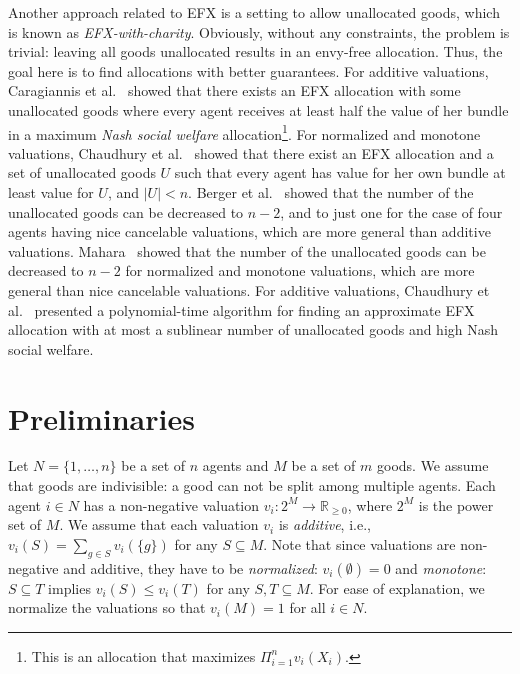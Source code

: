 \documentclass[11pt]{article}
\newcommand{\EFX}{\textsf{EFX}\xspace}
\begin{document}
Another approach related to \EFX is a setting to allow unallocated goods, which is known as {\it \EFX-with-charity}.
Obviously, without any constraints, the problem is trivial: leaving all goods unallocated results in an envy-free allocation.
Thus, the goal here is to find allocations with better guarantees.
For additive valuations, Caragiannis et al.~\cite{caragiannis2019envy} showed that there exists an \EFX allocation with some unallocated goods where every agent receives at least half the value of her bundle in a maximum {\it Nash social welfare} allocation\footnote{This is an allocation that maximizes $\Pi_{i = 1}^n v_i(X_i)$.}.
For normalized and monotone valuations, Chaudhury et al.~\cite{chaudhury2021little} showed that there exist an \EFX allocation and a set of unallocated goods $U$ such that every agent has value for her own bundle at least value for $U$, and $|U| < n$.
Berger et al.~\cite{berger2022almost} showed that the number of the unallocated goods can be decreased to $n-2$, and to just one for the case of four agents having nice cancelable valuations, which are more general than additive valuations.
Mahara~\cite{mahara2021extension} showed that the number of the unallocated goods can be decreased to $n-2$ for normalized and monotone valuations, which are more general than nice cancelable valuations.
For additive valuations, Chaudhury et al.~\cite{chaudhury2021improving} presented a polynomial-time algorithm for finding 
an approximate \EFX allocation with at most a sublinear number of unallocated goods and high Nash social welfare. 

\section{Preliminaries}
\label{sec: pre}
Let $N=\{1,\ldots, n\}$ be a set of $n$ agents and $M$ be a set of $m$ goods. 
We assume that goods are indivisible: a good can not be split among multiple agents.
Each agent $i \in N$ has a non-negative valuation $v_i: 2^M \rightarrow \mathbb{R}_{\ge 0}$, where $2^M$ is the power set of $M$.
We assume that each valuation $v_i$ is {\it additive}, i.e., $v_i(S)=\sum_{g\in S} v_i(\{g\})$ for any $S\subseteq M$.
Note that since valuations are non-negative and additive, they have to be {\it normalized}: $v_i(\emptyset) = 0$ and {\it monotone}: $S\subseteq T$ implies $v_i(S) \le v_i(T)$ for any $S,T \subseteq M$.
For ease of explanation, we normalize the valuations so that $v_i(M)=1$ for all $i\in N$.
\end{document}

